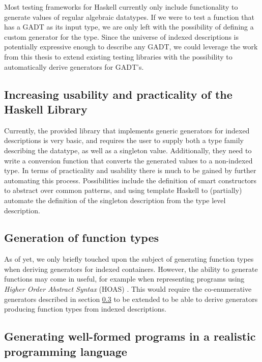 \documentclass[a4paper,msc,twosized=semi]{uustthesis}
\begin{document}
  Most testing frameworks for Haskell currently only include functionality to generate values of regular algebraic datatypes. If we were to test a function that has a GADT as its input type, we are only left with the possibility of defining a custom generator for the type. Since the universe of indexed descriptions is potentially expressive enough to describe any GADT, we could leverage the work from this thesis to extend existing testing libraries with the possibility to automatically derive generators for GADT's. 

\subsection{Increasing usability and practicality of the Haskell Library}

  Currently, the provided library that implements generic generators for indexed descriptions is very basic, and requires the user to supply both a type family describing the datatype, as well as a singleton value. Additionally, they need to write a conversion function that converts the generated values to a non-indexed type. In terms of practicality and usability there is much to be gained by further automating this process. Possibilities include the definition of smart constructors to abstract over common patterns, and using template Haskell \cite{sheard2002template} to (partially) automate the definition of the singleton description from the type level description. 

\subsection{Generation of function types}

  As of yet, we only briefly touched upon the subject of generating function types when deriving generators for indexed containers. However, the ability to generate functions may come in useful, for example when representing programs using \emph{Higher Order Abstract Syntax} (HOAS) \cite{pfenning1988higher}. This would require the co-enumerative generators described in section \ref{} to be extended to be able to derive generators producing function types from indexed descriptions. 

\subsection{Generating well-formed programs in a realistic programming language}
\end{document}
